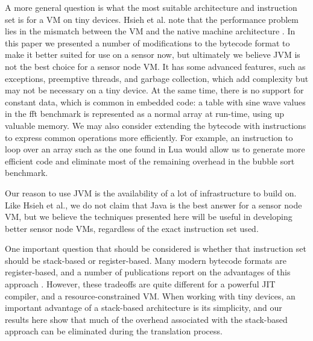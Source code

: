 A more general question is what the most suitable architecture and instruction set is for a VM on tiny devices. Hsieh et al. note that the performance problem lies in the mismatch between the VM and the native machine architecture \cite{Hsieh:1996cy}. In this paper we presented a number of modifications to the bytecode format to make it better suited for use on a sensor now, but ultimately we believe JVM is not the best choice for a sensor node VM. It has some advanced features, such as exceptions, preemptive threads, and garbage collection, which add complexity but may not be necessary on a tiny device. At the same time, there is no support for constant data, which is common in embedded code: a table with sine wave values in the fft benchmark is represented as a normal array at run-time, using up valuable memory.
We may also consider extending the bytecode with instructions to express common operations more efficiently. For example, an instruction to loop over an array such as the one found in Lua \cite{Lua:2005} would allow us to generate more efficient code and eliminate most of the remaining overhead in the bubble sort benchmark.


Our reason to use JVM is the availability of a lot of infrastructure to build on. Like Hsieh et al., we do not claim that Java is the best answer for a sensor node VM, but we believe the techniques presented here will be useful in developing better sensor node VMs, regardless of the exact instruction set used.

One important question that should be considered is whether that instruction set should be stack-based or register-based. Many modern bytecode formats are register-based, and a number of publications report on the advantages of this approach \cite{Zhang:2012wf, Shi:2005ba}. However, these tradeoffs are quite different for a powerful JIT compiler, and a resource-constrained VM. When working with tiny devices, an important advantage of a stack-based architecture is its simplicity, and our results here show that much of the overhead associated with the stack-based approach can be eliminated during the translation process.

